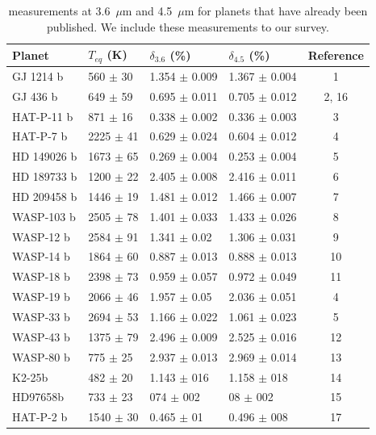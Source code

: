 \begin{table}
\caption{\spitzer measurements at 3.6~$\mu$m and 4.5~$\mu$m for planets that have already been published. We include these measurements to our survey.}
\label{P1:tab:littransits}
\centering
\begin{tabular}{llllc}
\hline\hline
Planet &    $T_{eq}$ (K) & $\delta_{3.6}$ (\%) & $\delta_{4.5}$ (\%) & Reference \\
\hline
GJ 1214 b   &   560 $\pm$ 30 &     1.354 $\pm$ 0.009 &     1.367 $\pm$ 0.004 & 1 \\
GJ 436 b    &   649 $\pm$ 59 &     0.695 $\pm$ 0.011 &     0.705 $\pm$ 0.012 & 2, 16 \\
HAT-P-11 b  &   871 $\pm$ 16 &     0.338 $\pm$ 0.002 &     0.336 $\pm$ 0.003 & 3 \\
HAT-P-7 b   &  2225 $\pm$ 41 &     0.629 $\pm$ 0.024 &     0.604 $\pm$ 0.012 & 4 \\
HD 149026 b &  1673 $\pm$ 65 &     0.269 $\pm$ 0.004 &     0.253 $\pm$ 0.004 & 5 \\
HD 189733 b &  1200 $\pm$ 22 &     2.405 $\pm$ 0.008 &     2.416 $\pm$ 0.011 & 6 \\
HD 209458 b &  1446 $\pm$ 19 &     1.481 $\pm$ 0.012 &     1.466 $\pm$ 0.007 & 7 \\
WASP-103 b  &  2505 $\pm$ 78 &     1.401 $\pm$ 0.033 &     1.433 $\pm$ 0.026 & 8 \\
WASP-12 b   &  2584 $\pm$ 91 &      1.341 $\pm$ 0.02 &     1.306 $\pm$ 0.031 & 9 \\
WASP-14 b   &  1864 $\pm$ 60 &     0.887 $\pm$ 0.013 &     0.888 $\pm$ 0.013 & 10 \\
WASP-18 b   &  2398 $\pm$ 73 &     0.959 $\pm$ 0.057 &     0.972 $\pm$ 0.049 & 11 \\
WASP-19 b   &  2066 $\pm$ 46 &      1.957 $\pm$ 0.05 &     2.036 $\pm$ 0.051 & 4 \\
WASP-33 b   &  2694 $\pm$ 53 &     1.166 $\pm$ 0.022 &     1.061 $\pm$ 0.023 & 5 \\
WASP-43 b   &  1375 $\pm$ 79 &     2.496 $\pm$ 0.009 &     2.525 $\pm$ 0.016 & 12 \\
WASP-80 b   &   775 $\pm$ 25 &     2.937 $\pm$ 0.013 &     2.969 $\pm$ 0.014 & 13 \\
K2-25b      &   482 $\pm$ 20 &     1.143 $\pm$ 016 &     1.158 $\pm$ 018 & 14   \\
HD97658b    &   733 $\pm$ 23 &     074 $\pm$ 002 &      08 $\pm$ 002 & 15 \\
HAT-P-2 b   &  1540 $\pm$ 30 &      0.465 $\pm$ 01 &     0.496 $\pm$ 008 & 17 \\
\hline
\end{tabular}



\end{table}

